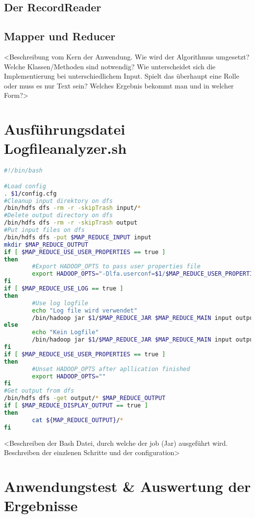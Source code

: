 \subsection{Der RecordReader}


\subsection{Mapper und Reducer}

<Beschreibung vom Kern der Anwendung. Wie wird der Algorithmus umgesetzt? Welche Klassen/Methoden sind notwendig? Wie unterscheidet sich die Implementierung bei unterschiedlichem Input. Spielt das überhaupt eine Rolle oder muss es nur Text sein? Welches Ergebnis bekommt man und in welcher Form?>

\section{Ausführungsdatei Logfileanalyzer.sh}

\begin{lstlisting}[language=Bash,caption=Ausführungsdatei Logfileanalyzer.sh,label=lis:Logfileanalyzer.sh]
#!/bin/bash

#Load config
. $1/config.cfg
#Cleanup input direktory on dfs
/bin/hdfs dfs -rm -r -skipTrash input/*
#Delete output directory on dfs
/bin/hdfs dfs -rm -r -skipTrash output
#Put input files on dfs
/bin/hdfs dfs -put $MAP_REDUCE_INPUT input
mkdir $MAP_REDUCE_OUTPUT
if [ $MAP_REDUCE_USE_USER_PROPERTIES == true ]
then
        #Export HADOOP_OPTS to pass user properties file
        export HADOOP_OPTS="-Dlfa.userconf=$1/$MAP_REDUCE_USER_PROPERTIES"
fi
if [ $MAP_REDUCE_USE_LOG == true ]
then
        #Use log logfile
        echo "Log file wird verwendet"
        /bin/hadoop jar $1/$MAP_REDUCE_JAR $MAP_REDUCE_MAIN input output 2> $MAP_REDUCE_LOGFILE
else
        echo "Kein Logfile"
        /bin/hadoop jar $1/$MAP_REDUCE_JAR $MAP_REDUCE_MAIN input output
fi
if [ $MAP_REDUCE_USE_USER_PROPERTIES == true ]
then
        #Unset HADOOP_OPTS after apllication finished
        export HADOOP_OPTS=""
fi
#Get output from dfs
/bin/hdfs dfs -get output/* $MAP_REDUCE_OUTPUT
if [ $MAP_REDUCE_DISPLAY_OUTPUT == true ]
then
        cat ${MAP_REDUCE_OUTPUT}/*
fi
\end{lstlisting}

<Beschreiben der Bash Datei, durch welche der job (Jar) ausgeführt wird. Beschreiben der einzlenen Schritte und der configuration>

\section{Anwendungstest \& Auswertung der Ergebnisse}


